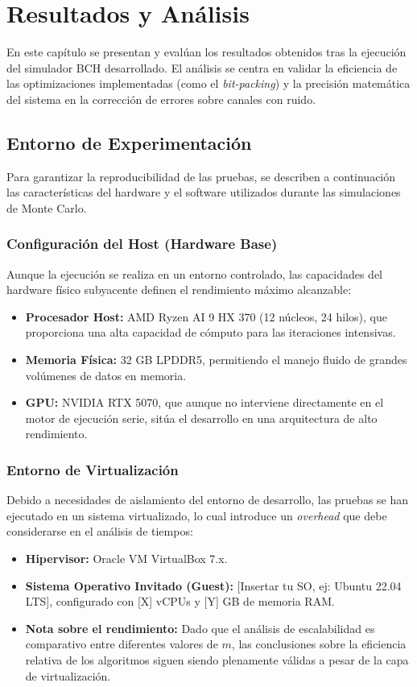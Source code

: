 \chapter{Resultados y Análisis}
\label{cap:resultados}

En este capítulo se presentan y evalúan los resultados obtenidos tras la ejecución del simulador BCH desarrollado. El análisis se centra en validar la eficiencia de las optimizaciones implementadas (como el \textit{bit-packing}) y la precisión matemática del sistema en la corrección de errores sobre canales con ruido.

\section{Entorno de Experimentación}
Para garantizar la reproducibilidad de las pruebas, se describen a continuación las características del hardware y el software utilizados durante las simulaciones de Monte Carlo.

\subsection{Configuración del Host (Hardware Base)}
Aunque la ejecución se realiza en un entorno controlado, las capacidades del hardware físico subyacente definen el rendimiento máximo alcanzable:
\begin{itemize}
    \item \textbf{Procesador Host:} AMD Ryzen AI 9 HX 370 (12 núcleos, 24 hilos), que proporciona una alta capacidad de cómputo para las iteraciones intensivas.
    \item \textbf{Memoria Física:} 32 GB LPDDR5, permitiendo el manejo fluido de grandes volúmenes de datos en memoria.
    \item \textbf{GPU:} NVIDIA RTX 5070, que aunque no interviene directamente en el motor de ejecución serie, sitúa el desarrollo en una arquitectura de alto rendimiento.
\end{itemize}

\subsection{Entorno de Virtualización}
Debido a necesidades de aislamiento del entorno de desarrollo, las pruebas se han ejecutado en un sistema virtualizado, lo cual introduce un \textit{overhead} que debe considerarse en el análisis de tiempos:
\begin{itemize}
    \item \textbf{Hipervisor:} Oracle VM VirtualBox 7.x.
    \item \textbf{Sistema Operativo Invitado (Guest):} [Insertar tu SO, ej: Ubuntu 22.04 LTS], configurado con [X] vCPUs y [Y] GB de memoria RAM.
    \item \textbf{Nota sobre el rendimiento:} Dado que el análisis de escalabilidad es comparativo entre diferentes valores de $m$, las conclusiones sobre la eficiencia relativa de los algoritmos siguen siendo plenamente válidas a pesar de la capa de virtualización.
\end{itemize}

